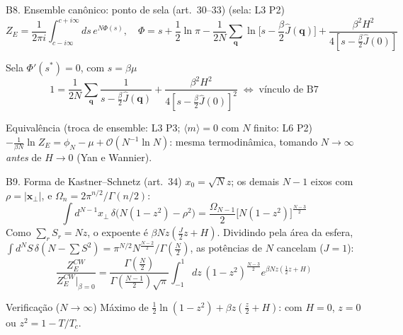 \documentclass[10pt,aspectratio=169]{beamer}
\newcommand{\lista}[1]{\textcolor{qcdGreen!70!black}{\small(#1)}}
\newcommand{\eq}[1]{\textcolor{qcdBlue!70!black}{\small(#1)}}
\begin{document}
\begin{frame}{B8. Ensemble canônico: ponto de sela \eq{art.~30--33} \lista{sela: L3 P2}}
  \small
  \[Z_E=\frac1{2\pi i}\int_{c-i\infty}^{c+i\infty}ds\,e^{N\Phi(s)},\quad
    \Phi=s+\frac12\ln\pi-\frac1{2N}\sum_{\mathbf q}\ln\Big[s-\frac\beta2\hat J(\mathbf q)\Big]+\frac{\beta^2H^2}{4[s-\frac\beta2\hat J(0)]}\]
  \begin{block}{Sela $\Phi'(s^*)=0$, com $s=\beta\mu$}
    \[1=\frac1{2N}\sum_{\mathbf q}\frac1{s-\frac\beta2\hat J(\mathbf q)}+\frac{\beta^2H^2}{4[s-\frac\beta2\hat J(0)]^2}
      \;\Longleftrightarrow\;\text{vínculo de B7}\]
  \end{block}
  \begin{block}{Equivalência \lista{troca de ensemble: L3 P3; $\langle m\rangle=0$ com $N$ finito: L6 P2}}
    $-\frac1{\beta N}\ln Z_E=\phi_N-\mu+\mathcal O(N^{-1}\ln N)$: mesma termodinâmica, tomando
    $N\to\infty$ \emph{antes} de $H\to0$ (Yan e Wannier).
  \end{block}
\end{frame}

\begin{frame}{B9. Forma de Kastner--Schnetz \eq{art.~34}}
  \small
  $x_0=\sqrt Nz$; os demais $N-1$ eixos com $\rho=|\mathbf x_\perp|$, e $\Omega_n=2\pi^{n/2}/\Gamma(n/2)$:
  \[\int d^{N-1}x_\perp\,\delta\big(N(1-z^2)-\rho^2\big)=\frac{\Omega_{N-1}}2\big[N(1-z^2)\big]^{\frac{N-3}2}\]
  Como $\sum_rS_r=Nz$, o expoente é $\beta Nz(\frac J2z+H)$. Dividindo pela área da esfera,
  $\int d^NS\,\delta(N-\sum S^2)=\pi^{N/2}N^{\frac{N-2}2}/\Gamma(\frac N2)$, as potências de $N$ cancelam ($J=1$):
  \[\frac{Z_E^{CW}}{Z_E^{CW}|_{\beta=0}}=\frac{\Gamma(\frac N2)}{\Gamma(\frac{N-1}2)\sqrt\pi}\int_{-1}^1dz\,(1-z^2)^{\frac{N-3}2}e^{\beta Nz(\frac12z+H)}\]
  \begin{exampleblock}{Verificação ($N\to\infty$)}
    Máximo de $\frac12\ln(1-z^2)+\beta z(\frac z2+H)$: com $H=0$, $z=0$ ou $z^2=1-T/T_c$.
  \end{exampleblock}
\end{frame}
\end{document}
